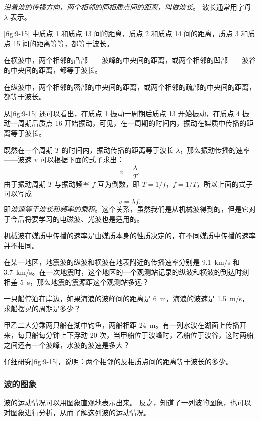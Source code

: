 \emph{沿着波的传播方向，两个相邻的同相质点间的距离，叫做波长}。
波长通常用字母 $\lambda$ 表示。

\cref{fig:9-15} 中质点 1 和质点 13 间的距离，质点 2 和质点 14 间的距离，质点 3 和质点 15 间的距离等等，都等于波长。

在横波中，两个相邻的凸部——波峰的中央间的距离，或两个相邻的凹部——波谷的中央间的距离，都等于波长。

在纵波中，两个相邻的密部的中央间的距离，或两个相邻的疏部的中央间的距离，都等于波长。

从\cref{fig:9-15} 还可以看出，在质点 1 振动一周期后质点 13 开始振动，在质点 4 振动一周期后质点 16 开始振动，可见，在一周期的时间内，振动在媒质中传播的距离等于波长。

既然在一个周期 $T$ 的时间内，振动传播的距离等于波长 $\lambda$，那么振动传播的速率——波速 $v$ 可以根据下面的式子求出：
\[v=\frac{\lambda}{T}.\]
由于振动周期 $T$ 与振动频率 $f$ 互为倒数，即 $T=1/f$，$f=1/T$，所以上面的式子可以写成
\[v=\lambda f.\]
即\emph{波速等于波长和频率的乘积}。这个关系，虽然我们是从机械波得到的，但是它对于今后将要学习的电磁波、光波也是适用的。

机械波在媒质中传播的速率是由媒质本身的性质决定的，在不同媒质中传播的速率并不相同。

\begin{Practice}
\begin{question}
  \item 在某一地区，地震波的纵波和横波在地表附近的传播速率分别是 \qty{9.1}{km/s} 和 \qty{3.7}{km/s}。在一次地震时，这个地区的一个观测站记录的纵波和横波的到达时刻相差 \qty{5}{s}，那么地震的震源距这个观测站多远？
  \item 一只船停泊在岸边，如果海浪的波峰间的距离是 \qty{6}{m}，海浪的波速是 \qty{1.5}{m/s}，求船摆晃的周期是多少？
  \item 甲乙二人分乘两只船在湖中钓鱼，两船相距 \qty{24}{m}。有一列水波在湖面上传播开来，每只船每分钟上下浮动 20 次，当甲船位于波峰时，乙船位于波谷，这时两船之间还有一个波峰，水波的波速是多大？
  \item 仔细研究\cref{fig:9-15}，说明：两个相邻的反相质点间的距离等于波长的多少。
\end{question}
\end{Practice}

\subsubsection{波的图象}
波的运动情况可以用图象直观地表示出来。
反之，知道了一列波的图象，也可以对图象进行分析，从而了解这列波的运动情况。

